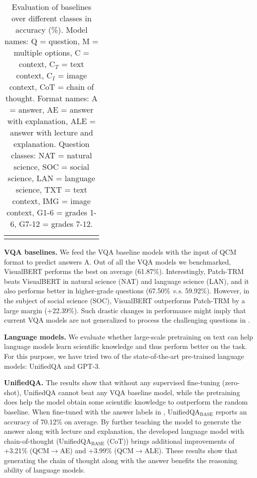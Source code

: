 \begin{table}[t!]
{\begin{tabular}{ccc|ccc|ccc|cc|p{1.2cm}}
$$ \bottomrule
\end{tabular}
}
 \vspace{1mm}
 \caption{Evaluation of baselines over different classes in accuracy (\%). Model names: Q = question, M = multiple options, C = context, C$_T$ = text context, C$_I$ = image context, CoT = chain of thought. Format names: A = answer, AE = answer with explanation, ALE = answer with lecture and explanation. Question classes: NAT = natural science, SOC = social science, LAN = language science, TXT = text context, IMG = image context, G1-6 = grades 1-6, G7-12 = grades 7-12. }
\label{tab:main_results}
\end{table}


\textbf{VQA baselines.} We feed the VQA baseline models with the input of QCM format to predict answers A. Out of all the VQA models we benchmarked, VisualBERT \cite{li2019visualbert,li2020does} performs the best on average (61.87\%). Interestingly, Patch-TRM \cite{lu2021iconqa} beats VisualBERT in natural science (NAT) and language science (LAN), and it also performs better in higher-grade questions (67.50\% \textit{v.s.} 59.92\%). However, in the subject of social science (SOC), VisualBERT outperforms Patch-TRM by a large margin (+22.39\%). 
Such drastic changes in performance might imply that current VQA models are not generalized to process the challenging questions in \name{}.

\textbf{Language models.} We evaluate whether large-scale pretraining on text can help language models learn scientific knowledge and thus perform better on the \name{} task. For this purpose, we have tried two of the state-of-the-art pre-trained language models: UnifiedQA and GPT-3.

 \textbf{UnifiedQA.} The results show that without any supervised fine-tuning (zero-shot), UnifiedQA cannot beat any VQA baseline model, while the pretraining does help the model obtain some scientific knowledge to outperform the random baseline. When fine-tuned with the answer labels in \name{}, UnifiedQA$_\text{BASE}$ reports an accuracy of 70.12\% on average. By further teaching the model to generate the answer along with lecture and explanation, the developed language model with chain-of-thought (UnifiedQA$_\text{BASE}$ (CoT)) brings additional improvements of +3.21\% (QCM$\rightarrow$AE) and +3.99\% (QCM$\rightarrow$ALE). These results show that generating the chain of thought along with the answer benefits the reasoning ability of language models. 

